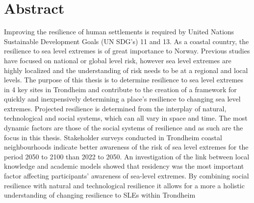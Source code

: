 

\section{Abstract}

Improving the resilience of human settlements is required by United Nations Sustainable Development Goals (UN SDG's) 11 and 13. As a coastal country, the resilience to sea level extremes is of great importance to Norway. Previous studies have focused on national or global level risk, however sea level extremes are highly localized  and the understanding of risk needs to be at a regional and local levels. The purpose of this thesis is to determine resilience to sea level extremes in 4 key sites in Trondheim and contribute to the creation of a framework for quickly and inexpensively determining a place's resilience to changing sea level extremes. Projected resilience is determined from the interplay of natural, technological and social systems, which can all vary in space and time. The most dynamic factors are those of the social systems of resilience and as such are the focus in this thesis. Stakeholder surveys conducted in Trondheim coastal neighbourhoods indicate better awareness of the risk of sea level extremes for the period 2050 to 2100 than 2022 to 2050. An  investigation of the link between local knowledge and academic models showed that residency was the most important factor affecting participants' awareness of sea-level extremes.  By combining social resilience with natural and technological resilience it allows for a more a holistic understanding of changing resilience to SLEs within Trondheim
   

\newpage

